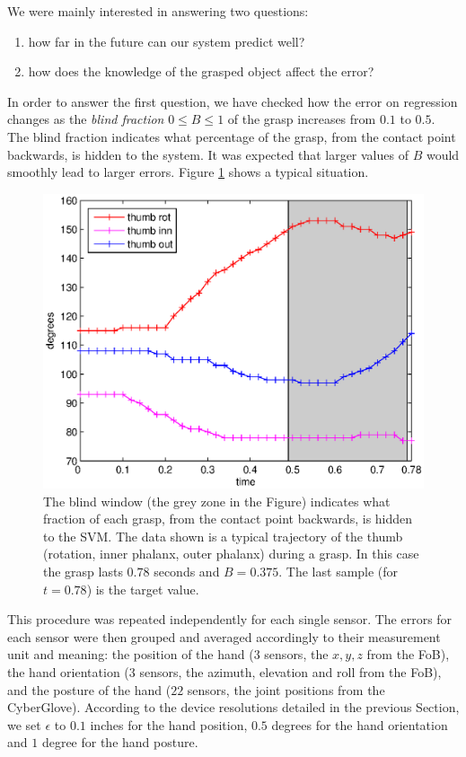 We were mainly interested in answering two questions:

\begin{enumerate}

  \item how far in the future can our system predict well?

  \item how does the knowledge of the grasped object affect the error?

\end{enumerate}

In order to answer the first question, we have checked how the error
on regression changes as the \emph{blind fraction} $0 \leq B \leq 1$
of the grasp increases from $0.1$ to $0.5$. The blind fraction
indicates what percentage of the grasp, from the contact point
backwards, is hidden to the system. It was expected that larger values
of $B$ would smoothly lead to larger errors. Figure
\ref{fig:B_example} shows a typical situation.

\begin{figure}[htbp]
  \begin{center}
    \includegraphics[width=0.5\linewidth]{B_example.eps}
    \caption{The blind window (the grey zone in the Figure) indicates
    what fraction of each grasp, from the contact point backwards, is
    hidden to the SVM. The data shown is a typical trajectory of the
    thumb (rotation, inner phalanx, outer phalanx) during a grasp. In
    this case the grasp lasts $0.78$ seconds and $B=0.375$. The last
    sample (for $t=0.78$) is the target value.}
    \label{fig:B_example}
  \end{center}
\end{figure}

This procedure was repeated independently for each single sensor. The
errors for each sensor were then grouped and averaged accordingly to
their measurement unit and meaning: the position of the hand ($3$
sensors, the $x,y,z$ from the FoB), the hand orientation ($3$ sensors,
the azimuth, elevation and roll from the FoB), and the posture of the
hand ($22$ sensors, the joint positions from the
CyberGlove). According to the device resolutions detailed in the
previous Section, we set $\epsilon$ to $0.1$ inches for the hand
position, $0.5$ degrees for the hand orientation and $1$ degree for
the hand posture.

